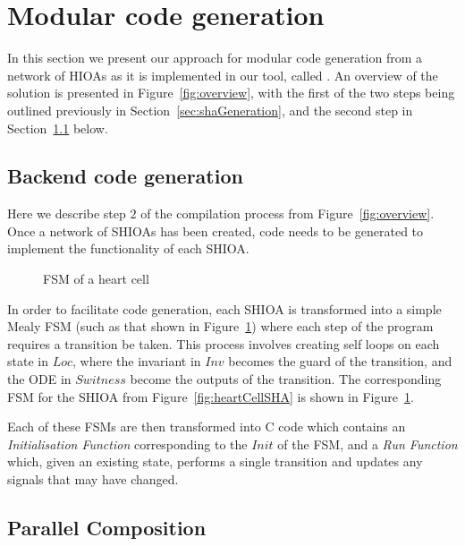 \section{Modular code generation}
\label{sec:codeGen}

In this section we present our approach for modular code generation from
a network of \acp{HIOA} as it is implemented in our tool, called
\ourTool.  An overview of the solution is presented in
Figure~\ref{fig:overview}, with the first of the two steps being
outlined previously in Section~\ref{sec:shaGeneration}, and the second
step in Section~\ref{sec:backendCodeGeneration} below.



\subsection{Backend code generation}
\label{sec:backendCodeGeneration}

Here we describe step $2$ of the compilation process from Figure~\ref{fig:overview}.
Once a network of \acp{SHIOA} has been created, code needs to be generated to implement the functionality of each \ac{SHIOA}.

\begin{figure}
	\centering
	
	\caption{\acf{FSM} of a heart cell \label{fig:heartCellFSM}}
\end{figure}

In order to facilitate code generation, each \ac{SHIOA} is transformed
into a simple Mealy \ac{FSM} (such as that shown in
Figure~\ref{fig:heartCellFSM}) where each step of the program requires a
transition be taken.  This process involves creating self loops on each
state in $Loc$, where the invariant in $Inv$ becomes the guard of the
transition, and the \acs{ODE} in $Switness$ become the outputs of the
transition.  The corresponding \ac{FSM} for the \ac{SHIOA} from
Figure~\ref{fig:heartCellSHA} is shown in Figure~\ref{fig:heartCellFSM}.

Each of these \acp{FSM} are then transformed into C code which contains
an \emph{Initialisation Function} corresponding to the $Init$ of the
\ac{FSM}, and a \emph{Run Function} which, given an existing state,
performs a single transition and updates any signals that may have
changed.


\subsection{Parallel Composition}
\label{sec:composition}

